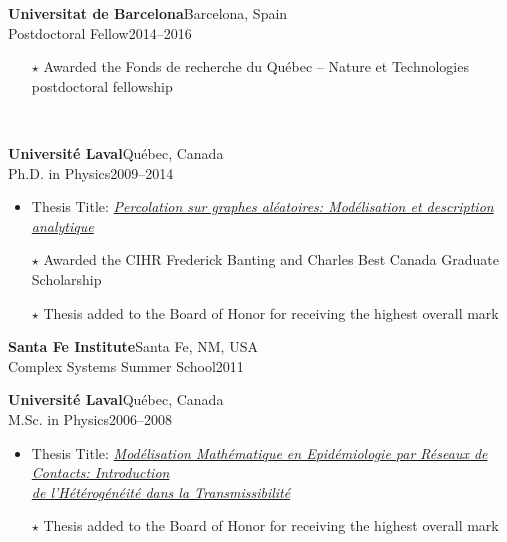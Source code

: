 \documentclass[11pt]{article}
\newcommand{\TitreSection}[1]{\colorbox{background}{\makebox[\textwidth-0.5em][c]{\Large\textrm{\textsc{#1}}}}\vspace{0.75\baselineskip}\\}
\begin{document}
%
\parbox[t]{\textwidth}{%
\textbf{Universitat de Barcelona}\hfill Barcelona, Spain\\
Postdoctoral Fellow\hfill 2014--2016
\begin{itemize}[leftmargin=1.5em]\small
  \item[$\star$] Awarded the Fonds de recherche du Qu\'ebec -- Nature et Technologies postdoctoral fellowship
\end{itemize}
\vspace{0.75\baselineskip}}
%
%
%
%
%
\TitreSection{Education}
%
\parbox[t]{\textwidth}{%
\textbf{Universit\'e Laval}\hfill Qu\'ebec, Canada\\
Ph.D. in Physics\hfill 2009--2014
\begin{itemize}[leftmargin=1.5em]\small
  \item Thesis Title: \href{http://hdl.handle.net/20.500.11794/25058}{\textit{Percolation sur graphes al\'eatoires: Mod\'elisation et description analytique}}\footnotemark
  \item[$\star$] Awarded the CIHR Frederick Banting and Charles Best Canada Graduate Scholarship
  \item[$\star$] Thesis added to the Board of Honor for receiving the highest overall mark
\end{itemize}}
%
\parbox[t]{\textwidth}{%
\textbf{Santa Fe Institute}\hfill Santa Fe, NM, USA\\
Complex Systems Summer School\hfill 2011\\}
%
\parbox[t]{\textwidth}{%
\textbf{Universit\'e Laval}\hfill Qu\'ebec, Canada\\
M.Sc. in Physics\hfill 2006--2008
\begin{itemize}[leftmargin=1.5em]\small
  \item Thesis Title: \href{http://hdl.handle.net/20.500.11794/20317}{\textit{Mod\'elisation Math\'ematique en Epid\'emiologie par R\'eseaux de Contacts: Introduction\\de l'H\'et\'erog\'en\'eit\'e dans la Transmissibilit\'e}}\footnotemark
  \item[$\star$] Thesis added to the Board of Honor for receiving the highest overall mark
\end{itemize}}
\end{document}

